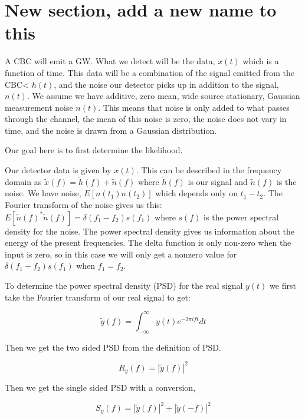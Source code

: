 \documentclass{iopart}
\begin{document}
\section{New section, add a new name to this}

A CBC will emit a GW. What we detect will be the data, $x(t)$ which is a function of time. This data will be a combination of the signal emitted from the CBC< $h(t)$, and the noise our detector picks up in addition to the signal, $n(t)$. We assume we have additive, zero mean, wide source stationary, Gaussian measurement noise $n(t)$. This means that noise is only added to what passes through the channel, the mean of this noise is zero, the noise does not vary in time, and the noise is drawn from a Gaussian distribution. 

Our goal here is to first determine the likelihood.

Our detector data is given by $x(t)$. This can be described in the frequency domain as $\tilde{x}(f) = \tilde{h}(f) + \tilde{n}(f)$ where $\tilde{h}(f)$ is our signal and $\tilde{n}(f)$ is the noise. We have noise, $E[n(t_1)n(t_2)]$ which depends only on $t_1 - t_2$. The Fourier transform of the noise gives us this: $E[\tilde{n}(f)^*\tilde{n}(f)] = \delta (f_1 - f_2) s(f_1)$ where $s(f)$ is the power spectral density for the noise. The power spectral density gives us information about the energy of the present frequencies. The delta function is only non-zero when the input is zero, so in this case we will only get a nonzero value for $\delta (f_1 - f_2) s(f_1)$ when $f_1 = f_2$. 

To determine the power spectral density (PSD) for the real signal $y(t)$ we first take the Fourier transform of our real signal to get:

\begin{equation}
	\tilde{y}(f) = \int_{-\infty}^{\infty}y(t)e^{-2\pi ift}dt
\end{equation}

Then we get the two sided PSD from the definition of PSD.
 
\begin{equation}
	R_y(f) = |\tilde{y}(f)|^2
\end{equation}

Then we get the single sided PSD with a conversion,

\begin{equation}
	S_y(f) = |\tilde{y}(f)|^2 + |\tilde{y}(-f)|^2
\end{equation}
\end{document}
